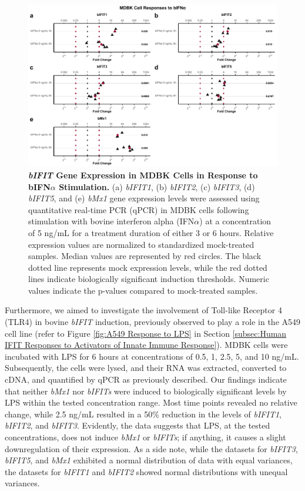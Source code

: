 \begin{figure}
    \centering
    \includegraphics[width=1\linewidth]{07. Chapter 2/Figs/02. Induction/01. mdbk_treat_bifna.pdf}
    \caption[\textit{bIFIT} Gene Expression in MDBK Cells in Response to bIFN\(\alpha\) Stimulation.]{\textbf{\textit{bIFIT} Gene Expression in MDBK Cells in Response to bIFN\(\alpha\) Stimulation.} (a) \textit{bIFIT1}, (b) \textit{bIFIT2}, (c) \textit{bIFIT3}, (d) \textit{bIFIT5}, and (e) \textit{bMx1} gene expression levels were assessed using quantitative real-time PCR (qPCR) in MDBK cells following stimulation with bovine interferon alpha (IFN\(\alpha\)) at a concentration of 5 ng/mL for a treatment duration of either 3 or 6 hours. Relative expression values are normalized to standardized mock-treated samples. Median values are represented by red circles. The black dotted line represents mock expression levels, while the red dotted lines indicate biologically significant induction thresholds. Numeric values indicate the p-values compared to mock-treated samples.}
    \label{fig:MDBK responses to bIFNa}
\end{figure}

Furthermore, we aimed to investigate the involvement of Toll-like Receptor 4 (TLR4) in bovine \textit{bIFIT} induction, previously observed to play a role in the A549 cell line (refer to Figure \ref{fig:A549 Response to LPS} in Section \ref{subsec:Human IFIT Responses to Activators of Innate Immune Response}). MDBK cells were incubated with LPS for 6 hours at concentrations of 0.5, 1, 2.5, 5, and 10 ng/mL. Subsequently, the cells were lysed, and their RNA was extracted, converted to cDNA, and quantified by qPCR as previously described. Our findings indicate that neither \textit{bMx1} nor \textit{bIFITs} were induced to biologically significant levels by LPS within the tested concentration range. Most time points revealed no relative change, while 2.5 ng/mL resulted in a 50\% reduction in the levels of \textit{bIFIT1}, \textit{bIFIT2}, and \textit{bIFIT3}. Evidently, the data suggests that LPS, at the tested concentrations, does not induce \textit{bMx1} or \textit{bIFITs}; if anything, it causes a slight downregulation of their expression. As a side note, while the datasets for \textit{bIFIT3}, \textit{bIFIT5}, and \textit{bMx1} exhibited a normal distribution of data with equal variances, the datasets for \textit{bIFIT1} and \textit{bIFIT2} showed normal distributions with unequal variances.


